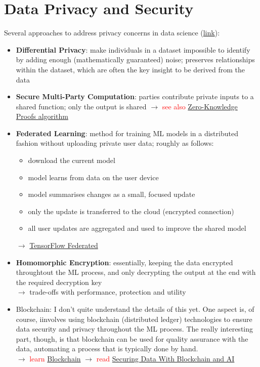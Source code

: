 \documentclass[a4, 12pt]{article}
\newcommand{\followup}[1]{\textcolor{red}{ #1 }}
\begin{document}
\newpage
\section{Data Privacy and Security}
Several approaches to address privacy concerns in data science (\href{https://analyticsindiamag.com/top-technologies-to-achieve-security-and-privacy-of-sensitive-data-in-ai-models/}{link}):
\begin{itemize}
    \item \textbf{Differential Privacy}: make individuals in a dataset impossible to identify by adding enough (mathematically guaranteed) noise; preserves relationships within the dataset, which are often the key insight to be derived from the data
    \item \textbf{Secure Multi-Party Computation}: parties contribute private inputs to a shared function; only the output is shared $\rightarrow$ \followup{see also \href{http://bid.berkeley.edu/projects/p4p/papers/duan08sdm.pdf}{Zero-Knowledge Proofs algorithm}}
    \item \textbf{Federated Learning}: method for training ML models in a distributed fashion without uploading private user data; roughly as follows:
    \begin{itemize}
        \item download the current model
        \item model learns from data on the user device
        \item model summarises changes as a small, focused update
        \item only the update is transferred to the cloud (encrypted connection)
        \item all user updates are aggregated and used to improve the shared model
    \end{itemize}
    $\rightarrow$ \followup{\href{https://www.tensorflow.org/federated}{TensorFlow Federated}}
    \item \textbf{Homomorphic Encryption}: essentially, keeping the data encrypted throughtout the ML process, and only decrypting the output at the end with the required decryption key \\
    $\rightarrow$ trade-offs with performance, protection and utility
    \item Blockchain: I don't quite understand the details of this yet. One aspect is, of course, iinvolves using blockchain (distributed ledger) technologies to ensure data security and privacy throughout the ML process. The really interesting part, though, is that blockchain can be used for quality assurance with the data, automating a process that is typically done by hand. \\
    $\rightarrow$ \followup {learn \href{https://analyticsindiamag.com/why-you-should-consider-blockchain-as-a-technology-to-learn/}{Blockchain}}
    $\rightarrow$ \followup{read \href{https://ieeexplore.ieee.org/abstract/document/8733072}{Securing Data With Blockchain and AI}}
\end{itemize}


\section{}






\end{document}
